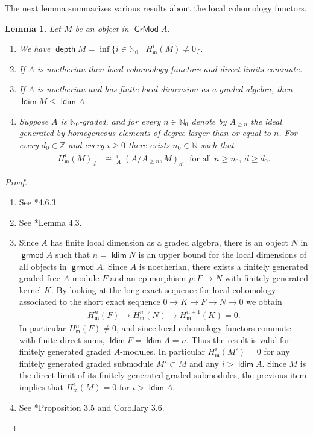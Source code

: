 \documentclass[11pt,fleqn]{article}
\theoremstyle{plain}
\newtheorem{Lemma}[Theorem]{Lemma}
\theoremstyle{remark}
\theoremstyle{definition}
\newcommand\NN{\mathbb N}
\newcommand\ZZ{\mathbb Z}
\renewcommand\to{\longrightarrow}
\newcommand\m{\mathfrak m}
\DeclareMathOperator\Gr{\mathsf{GrMod}}
\DeclareMathOperator\grmod{\mathsf{grmod}}
\DeclareMathOperator\GrExt{\underline{\mathsf{Ext}}}
\DeclareMathOperator\ldim{\mathsf{ldim}}
\DeclareMathOperator\depth{\mathsf{depth}}
\begin{document}
The next lemma summarizes various results about the local cohomology functors.
\begin{Lemma}
\label{lc-varia}
Let $M$ be an object in $\Gr A$.
\begin{enumerate}
\item We have $\depth M = \inf \{i \in \NN_0 \mid H_\m^i(M) \neq 0\}$.

\item If $A$ is noetherian then local cohomology functors and direct limits commute.

\item If $A$ is noetherian and has finite local dimension as a graded algebra, then 
$\ldim M \leq \ldim A$.

\item Suppose $A$ is $\NN_0$-graded, and for every $n \in \NN_0$ denote by $A_{\geq n}$
the ideal generated by homogeneous elements of degree larger than or equal to $n$.
For every $d_0 \in \ZZ$ and every $i \geq 0$ there exists $n_0 \in \NN$ such that 
\begin{align*}
H^i_\m(M)_d &\cong \GrExt_A^i(A/A_{\geq n},M)_d & \mbox{for all } n \geq n_0,\ d \geq d_0.
\end{align*}
\end{enumerate}
\end{Lemma}
\begin{proof}
\begin{enumerate}
\item See \cite{W}*{4.6.3}.

\item See \cite{vdB}*{Lemma 4.3}.

\item Since $A$ has finite local dimension as a graded algebra, there is an object $N$ in
$\grmod A$ such that $n = \ldim N$ is an upper bound for the local dimensions of all
objects in $\grmod A$. Since $A$ is noetherian, there exists a finitely generated
graded-free $A$-module $F$ and an epimorphism $p: F \to N$ with finitely generated kernel
$K$. By looking at the long exact sequence for local cohomology associated to the short
exact sequence $0 \to K \to F \to N \to 0$ we obtain
\begin{align*}
H_\m^n(F) \to H_\m^n(N) \to H^{n+1}_\m(K) = 0.
\end{align*}
In particular $H_\m^n(F) \neq 0$, and since local cohomology functors commute with finite
direct sums, $\ldim F = \ldim A = n$. Thus the result is valid for finitely generated graded
$A$-modules. In particular $H^i_\m(M') = 0$ for any finitely generated graded submodule
$M' \subset M$ and any $i > \ldim A$. Since $M$ is the direct limit of its finitely generated 
graded submodules, the previous item implies that $H^i_\m(M)=0$ for $i > \ldim A$.

\item See \cite{AZ}*{Proposition 3.5 and Corollary 3.6}.
\end{enumerate}
\end{proof}
\end{document}
